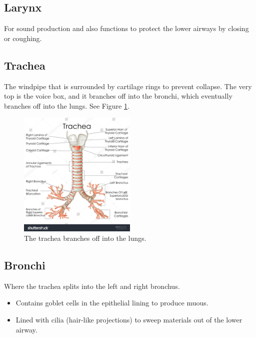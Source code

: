 \documentclass[12pt]{report}
\begin{document}
\subsection{Larynx}
\begin{definition}[Larynx]
    For sound production and also functions to protect the lower airways by closing or coughing.
\end{definition}

\subsection{Trachea}
\begin{definition}[Trachea]
    The windpipe that is surrounded by cartilage rings to prevent collapse. The very top is the voice box, and it branches off into the bronchi, which eventually branches off into the lungs. See Figure \ref{fig:trachea}.
\end{definition}

\begin{figure}[H]
\centering
    \includegraphics[width=0.5\textwidth]{../figures/trachea.jpg}
    \caption{The trachea branches off into the lungs.}
    \label{fig:trachea}
\end{figure}

\subsection{Bronchi}
\begin{definition}[Bronchi]
    Where the trachea splits into the left and right bronchus.
    \begin{itemize}
        \item{Contains goblet cells in the epithelial lining to produce muous.}
        \item{Lined with cilia (hair-like projections) to sweep materials out of the lower airway.}
    \end{itemize}
\end{definition}
\end{document}
